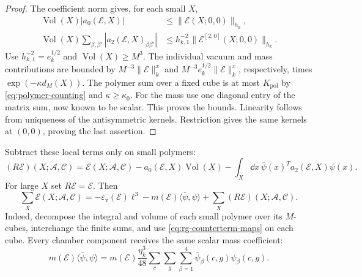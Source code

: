 \begin{proof}
The coefficient norm gives, for each small $X$,
\begin{equation}\label{eq:rg-single-extraction-bounds}
 \begin{split}
 \operatorname{Vol}(X)|a_0(\mathscr E,X)|
                    &\le\|\mathscr E(X;0,0)\|_{h_k},\\
 \operatorname{Vol}(X)\sum_{\beta,\beta'}
                              |a_2(\mathscr E,X)_{\beta\beta'}|
                    &\le h_{k,1}^{-2}
                               \|\mathscr E^{[2,0]}(X;0,0)\|_{h_k}.
 \end{split}
\end{equation}
Use $h_{k,1}^{-2}=e_k^{1/2}$ and
$\operatorname{Vol}(X)\ge M^3$. The individual vacuum and mass
contributions are bounded by $M^{-3}\|\mathscr E\|_k^x$ and
$M^{-3}e_k^{1/2}\|\mathscr E\|_k^x$, respectively, times
$\exp(-\kappa d_M(X))$.
The polymer sum over a fixed cube is at most $K_{\mathrm{pol}}$ by
\eqref{eq:polymer-counting} and $\kappa\ge\kappa_0$. For the mass use one diagonal entry of
the matrix sum, now known to be scalar. This proves the bounds.
Linearity follows from uniqueness of the antisymmetric kernels.
Restriction gives the same kernels at $(0,0)$, proving the
last assertion.
\end{proof}

Subtract these local terms only on small polymers:
\begin{equation}\label{eq:rg-normalized-remainder}
 (R\mathscr E)(X;\mathscr A,\mathscr C)
 =\mathscr E(X;\mathscr A,\mathscr C)
       -a_0(\mathscr E,X)\operatorname{Vol}(X)
       -\int_X\dd x\,\bar\psi(x)^Ta_2(\mathscr E,X)\psi(x).
\end{equation}
For large $X$ set $R\mathscr E=\mathscr E$. Then
\begin{equation}\label{eq:rg-exact-extraction-identity}
 \sum_X\mathscr E(X;\mathscr A,\mathscr C)
  =-\varepsilon_{\mathrm v}(\mathscr E)\ell^3
     -m(\mathscr E)\langle\bar\psi,\psi\rangle
                           +\sum_X(R\mathscr E)(X;\mathscr A,\mathscr C).
\end{equation}
Indeed, decompose the integral and volume of each small polymer
over its $M$-cubes, interchange the finite sums, and use
\eqref{eq:rg-counterterm-maps} on each cube. Every chamber
component receives the same scalar mass coefficient:
\[
 m(\mathscr E)\langle\bar\psi,\psi\rangle
 =m(\mathscr E)\frac{\eta_k^3}{48}
         \sum_c\sum_g\sum_{\beta=1}^4
                                      \bar\psi_\beta(c,g)\psi_\beta(c,g).
\]

